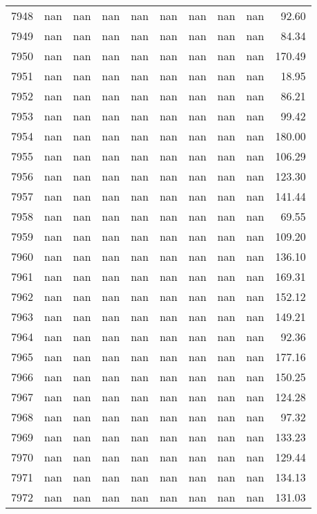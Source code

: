 \begin{tabular}{lrrrrrrrrr}
7948 & nan & nan & nan & nan & nan & nan & nan & nan & 92.60 \\
7949 & nan & nan & nan & nan & nan & nan & nan & nan & 84.34 \\
7950 & nan & nan & nan & nan & nan & nan & nan & nan & 170.49 \\
7951 & nan & nan & nan & nan & nan & nan & nan & nan & 18.95 \\
7952 & nan & nan & nan & nan & nan & nan & nan & nan & 86.21 \\
7953 & nan & nan & nan & nan & nan & nan & nan & nan & 99.42 \\
7954 & nan & nan & nan & nan & nan & nan & nan & nan & 180.00 \\
7955 & nan & nan & nan & nan & nan & nan & nan & nan & 106.29 \\
7956 & nan & nan & nan & nan & nan & nan & nan & nan & 123.30 \\
7957 & nan & nan & nan & nan & nan & nan & nan & nan & 141.44 \\
7958 & nan & nan & nan & nan & nan & nan & nan & nan & 69.55 \\
7959 & nan & nan & nan & nan & nan & nan & nan & nan & 109.20 \\
7960 & nan & nan & nan & nan & nan & nan & nan & nan & 136.10 \\
7961 & nan & nan & nan & nan & nan & nan & nan & nan & 169.31 \\
7962 & nan & nan & nan & nan & nan & nan & nan & nan & 152.12 \\
7963 & nan & nan & nan & nan & nan & nan & nan & nan & 149.21 \\
7964 & nan & nan & nan & nan & nan & nan & nan & nan & 92.36 \\
7965 & nan & nan & nan & nan & nan & nan & nan & nan & 177.16 \\
7966 & nan & nan & nan & nan & nan & nan & nan & nan & 150.25 \\
7967 & nan & nan & nan & nan & nan & nan & nan & nan & 124.28 \\
7968 & nan & nan & nan & nan & nan & nan & nan & nan & 97.32 \\
7969 & nan & nan & nan & nan & nan & nan & nan & nan & 133.23 \\
7970 & nan & nan & nan & nan & nan & nan & nan & nan & 129.44 \\
7971 & nan & nan & nan & nan & nan & nan & nan & nan & 134.13 \\
7972 & nan & nan & nan & nan & nan & nan & nan & nan & 131.03 \\

\end{tabular}
